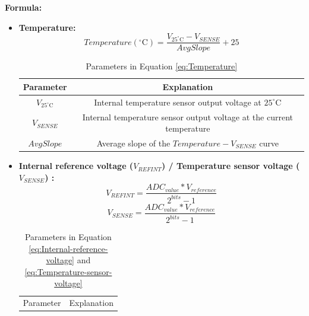 \documentclass[12pt,a4paper]{ctexart}
\begin{document}
\textbf{Formula:}
\begin{itemize}
    \item \textbf{Temperature:}
          \begin{equation}
              Temperature(^\circ\text{C})=\frac{V_{25^\circ\text{C}}-V_{SENSE}}{AvgSlope}+25
              \label{eq:Temperature}
          \end{equation}
          \begin{table}[htbp]
              \centering
              \caption{Parameters in Equation \eqref{eq:Temperature}}
              \begin{tabular}{|c|c|}
                  \hline
                  Parameter              & Explanation                                                           \\
                  \hline
                  $V_{25^\circ\text{C}}$ & Internal temperature sensor output voltage at $25^\circ\text{C}$      \\
                  \hline
                  $V_{SENSE}$            & Internal temperature sensor output voltage at the current temperature \\
                  \hline
                  $AvgSlope$             & Average slope of the $Temperature-V_{SENSE}$ curve                    \\
                  \hline
              \end{tabular}
          \end{table}
    \item \textbf{Internal reference voltage ($V_{REFINT}$) / Temperature sensor voltage ($V_{SENSE}$) :}
          \begin{equation}
              V_{REFINT}=\frac{ADC_{value}*V_{reference}}{2^{bits}-1}
              \label{eq:Internal-reference-voltage}
          \end{equation}
          \begin{equation}
              V_{SENSE}=\frac{ADC_{value}*V_{reference}}{2^{bits}-1}
              \label{eq:Temperature-sensor-voltage}
          \end{equation}
          \begin{table}[htbp]
              \centering
              \caption{Parameters in Equation \eqref{eq:Internal-reference-voltage} and \eqref{eq:Temperature-sensor-voltage}}
              \begin{tabular}{|c|c|}
                  \hline
                  Parameter       & Explanation           \\

\end{tabular}
\end{table}
\end{itemize}
\end{document}
